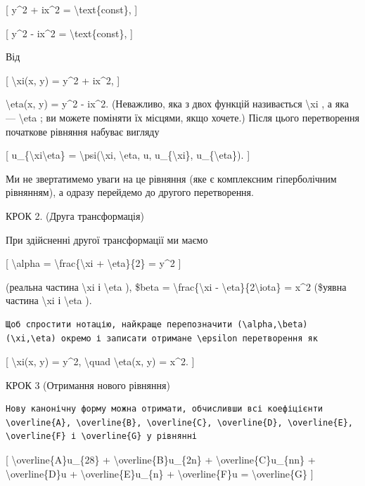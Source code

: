 \documentclass[
]{article}
\begin{document}
{[} y\^{}2 + ix\^{}2 = \textbackslash text\{const\}, {]}

{[} y\^{}2 - ix\^{}2 = \textbackslash text\{const\}, {]}

Від

{[} \textbackslash xi(x, y) = y\^{}2 + ix\^{}2, {]}

\textbackslash eta(x, y) = y\^{}2 - ix\^{}2. (Неважливо, яка з двох
функцій називається \textbackslash xi , а яка --- \textbackslash eta ;
ви можете поміняти їх місцями, якщо хочете.) Після цього перетворення
початкове рівняння набуває вигляду

{[} u\_\{\textbackslash xi\textbackslash eta\} =
\textbackslash psi(\textbackslash xi, \textbackslash eta, u,
u\_\{\textbackslash xi\}, u\_\{\textbackslash eta\}). {]}

Ми не звертатимемо уваги на це рівняння (яке є комплексним гіперболічним
рівнянням), а одразу перейдемо до другого перетворення.

КРОК 2. (Друга трансформація)

При здійсненні другої трансформації ми маємо

{[} \textbackslash alpha = \textbackslash frac\{\textbackslash xi +
\textbackslash eta\}\{2\} = y\^{}2 {]}

(реальна частина \textbackslash xi і \textbackslash eta ), \$beta =
\textbackslash frac\{\textbackslash xi -
\textbackslash eta\}\{2\textbackslash iota\} = x\^{}2 (\$уявна частина
\textbackslash xi і \textbackslash eta ).

\begin{verbatim}
Щоб спростити нотацію, найкраще перепозначити (\alpha,\beta) (\xi,\eta) окремо і записати отримане \epsilon перетворення як
\end{verbatim}

{[} \textbackslash xi(x, y) = y\^{}2, \textbackslash quad
\textbackslash eta(x, y) = x\^{}2. {]}

КРОК 3 (Отримання нового рівняння)

\begin{verbatim}
Нову канонічну форму можна отримати, обчисливши всі коефіцієнти \overline{A}, \overline{B}, \overline{C}, \overline{D}, \overline{E}, \overline{F} і \overline{G} у рівнянні
\end{verbatim}

{[} \textbackslash overline\{A\}u\_\{28\} +
\textbackslash overline\{B\}u\_\{2n\} +
\textbackslash overline\{C\}u\_\{nn\} + \textbackslash overline\{D\}u +
\textbackslash overline\{E\}u\_\{n\} + \textbackslash overline\{F\}u =
\textbackslash overline\{G\} {]}
\end{document}
